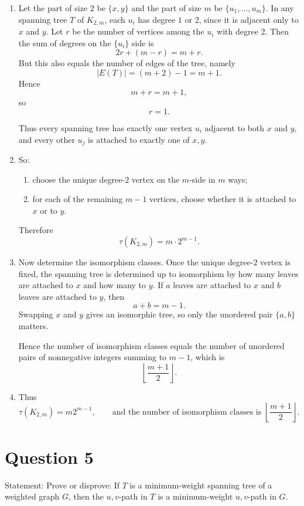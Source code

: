 \documentclass[11pt]{article}
\begin{document}
\begin{enumerate}
    \item Let the part of size $2$ be $\{x,y\}$ and the part of size $m$ be $\{u_1,\dots,u_m\}$. In any spanning tree $T$ of $K_{2,m}$, each $u_i$ has degree $1$ or $2$, since it is adjacent only to $x$ and $y$. Let $r$ be the number of vertices among the $u_i$ with degree $2$. Then the sum of degrees on the $\{u_i\}$ side is
\[
2r+(m-r)=m+r.
\]
But this also equals the number of edges of the tree, namely
\[
|E(T)|=(m+2)-1=m+1.
\]
Hence
\[
m+r=m+1,
\]
so
\[
r=1.
\]

Thus every spanning tree has exactly one vertex $u_i$ adjacent to both $x$ and $y$, and every other $u_j$ is attached to exactly one of $x,y$.

\item So:
\begin{enumerate}
\item choose the unique degree-$2$ vertex on the $m$-side in $m$ ways;
\item for each of the remaining $m-1$ vertices, choose whether it is attached to $x$ or to $y$.
\end{enumerate}

Therefore
\[
\tau(K_{2,m})=m\cdot 2^{m-1}.
\]

\item Now determine the isomorphism classes. Once the unique degree-$2$ vertex is fixed, the spanning tree is determined up to isomorphism by how many leaves are attached to $x$ and how many to $y$. If $a$ leaves are attached to $x$ and $b$ leaves are attached to $y$, then
\[
a+b=m-1.
\]
Swapping $x$ and $y$ gives an isomorphic tree, so only the unordered pair $\{a,b\}$ matters.

Hence the number of isomorphism classes equals the number of unordered pairs of nonnegative integers summing to $m-1$, which is
\[
\left\lfloor \frac{m+1}{2}\right\rfloor.
\]

\item Thus
\[
\tau(K_{2,m})=m2^{m-1},
\qquad
\text{and the number of isomorphism classes is }
\left\lfloor \frac{m+1}{2}\right\rfloor.
\]
\end{enumerate}

\newpage

\section*{Question 5}

Statement: {Prove or disprove: If $T$ is a minimum-weight spanning tree of a weighted graph $G$, then the $u,v$-path in $T$ is a minimum-weight $u,v$-path in $G$.}
\end{document}
